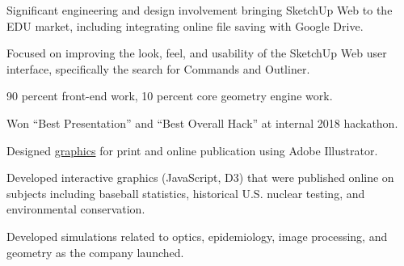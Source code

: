 \documentclass[]{mershon-two-column-resume}
\begin{document}
\begin{minipage}[t]{0.66\textwidth}
		\begin{tightemize}
			\item Significant engineering and design involvement bringing SketchUp Web to the EDU market, including integrating online file saving with Google Drive.
			\item Focused on improving the look, feel, and usability of the SketchUp Web user interface, specifically the search for Commands and Outliner.
			\item 90 percent front-end work, 10 percent core geometry engine work. 
			\item Won ``Best Presentation'' and ``Best Overall Hack'' at internal 2018 hackathon.
		\end{tightemize}
		\sectionsep
		
		\begin{tightemize}
			\item Designed \href{https://github.com/bmershon/published-urls}{graphics} for print and online publication using Adobe Illustrator. \item Developed interactive graphics (JavaScript, D3) that were published online on subjects including baseball statistics, historical U.S. nuclear testing, and environmental conservation.
		\end{tightemize}
		\sectionsep
		
		\sectionsep
		
		\begin{tightemize}
			\item Developed simulations related to optics, epidemiology, image processing, and geometry as the company launched.
		\end{tightemize}
		\sectionsep
		
	\end{minipage} 
\end{document}
